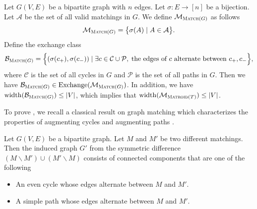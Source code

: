 \documentclass{article}
\newcommand{\M}{\mathcal M}
\newcommand{\B}{\mathcal B}
\newcommand{\del}{\backslash}
\DeclareMathOperator{\rank}{width}
\DeclareMathOperator{\Exchange}{Exchange}
\newcommand{\Matroid}{\textsc{Matroid}\xspace}
\newcommand{\Match}{\textsc{Match}\xspace}
\begin{document}
\begin{fact}[Matching]
\label{fact:match}
Let $G(V,E)$ be a bipartite graph with $n$ edges.
Let $\sigma\colon E\rightarrow [n]$ be a bijection.
Let $\mathcal A$ be the set of all valid matchings in $G$. 
We define $\M_{\Match(G)}$ as follows
$$
\M_{\Match(G)} = \big\{\sigma(A) \mid A\in\mathcal A \big\}.
$$
Define the exchange class
$$
\B_{\Match(G)} = \Big\{(\sigma(c_+),\sigma(c_-)) \mid \exists c\in \mathcal C\cup \mathcal P,\; \text{the edges of }c\text{ alternate between } c_+,c_-\Big\},
$$
where $\mathcal C$ is the set of all cycles in $G$ and $\mathcal P$ is the set of all paths in $G$.
Then we have $\B_{\Match(G)} \in \Exchange(\M_{\Match(G)})$. 
In addition, we have $\rank(\B_{\Match(G)}) \le |V|$, which implies that $\rank(\M_{\Matroid(T)}) \le |V|$. 
\end{fact}


To prove , we recall a classical result on graph matching which characterizes the properties of augmenting cycles and augmenting paths \citep{Berge15091957}.
\begin{lemma}
\label{lemma:match}
Let $G(V,E)$ be a bipartite graph.
Let $M$ and $M'$ be two different matchings.
Then the induced graph $G'$ from the symmetric difference $(M\del M')\cup (M'\del M)$ consists of connected components that are one of the following
\begin{itemize}
\item An even cycle whose edges alternate between $M$ and $M'$.
\item A simple path whose edges alternate between $M$ and $M'$.
\end{itemize}
\end{lemma}
\end{document}
